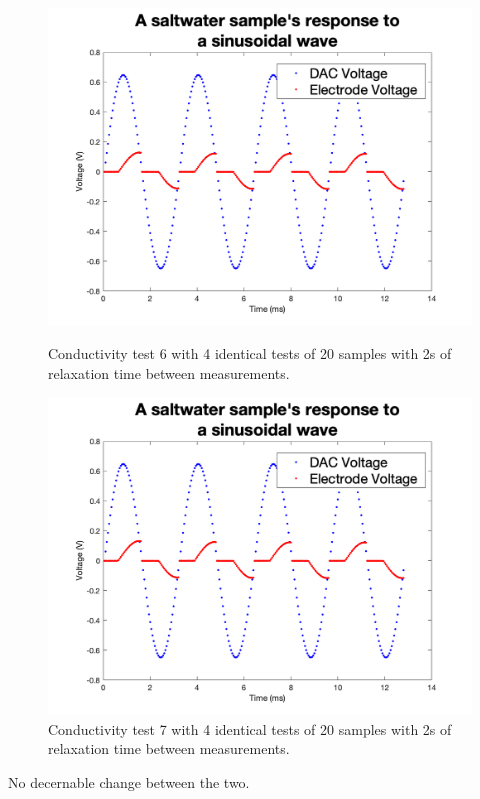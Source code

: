\begin{figure}[ht]
    \begin{minipage}{0.5\textwidth}
        \centering
        \includegraphics[width=\textwidth]{Figures/Testing/TiAC3}
        \caption{Conductivity test 6 with 4 identical tests of 20 samples with 2s of relaxation time between measurements.}
        \label{fig:test19} %
    \end{minipage}
    \begin{minipage}{0.5\textwidth}
        \centering
        \includegraphics[width=\textwidth]{Figures/Testing/TiAC4}
        \caption{Conductivity test 7 with 4 identical tests of 20 samples with 2s of relaxation time between measurements.}
        \label{fig:test20} %
    \end{minipage}
\end{figure}

No decernable change between the two.